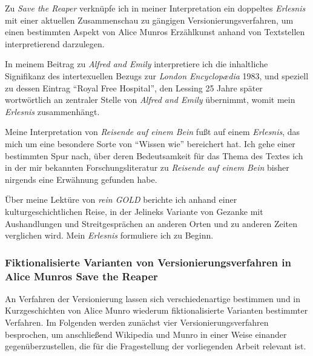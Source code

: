\documentclass[fontsize=12pt]{scrartcl}
\begin{document}
Zu \textit{Save the Reaper} verkn\"upfe ich in meiner Interpretation ein doppeltes \textit{Erlesnis} mit einer aktuellen Zusammenschau zu g\"angigen Versionierungsverfahren, um einen be\-stimmten Aspekt von Alice Munros Erz\"ahlkunst anhand von Textstellen interpretierend darzulegen.

In meinem Beitrag zu \textit{Alfred and Emily} interpretiere ich die inhaltliche Signifikanz des intertexuellen Bezugs zur \textit{London Encyclop{\ae}dia} 1983, und speziell zu dessen Eintrag "`Royal Free Hospital"', den Lessing 25 Jahre sp\"ater wortw\"ortlich an zentraler Stelle von \textit{Alfred and Emily} \"ubernimmt, womit mein \textit{Erlesnis} zusammenh\"angt.

Meine Interpretation von \textit{Reisende auf einem Bein} fu{\ss}t auf einem \textit{Erlesnis}, das mich um eine besondere Sorte von "`Wissen wie"' bereichert hat. Ich gehe einer bestimmten Spur nach, \"uber deren Bedeutsamkeit f\"ur das Thema des Textes ich in der mir bekannten For\-schungsli\-te\-ra\-tur zu \textit{Reisende auf einem Bein} bis\-her nirgends eine Erw\"ahnung gefunden habe.

\"Uber meine Lekt\"ure von \textit{rein GOLD} berichte ich anhand einer kulturgeschichtlichen Reise, in der Jelineks Variante von Gezanke mit Aushandlungen und Streit\-ge\-spr\"a\-chen an anderen Orten und zu anderen Zei\-ten verglichen wird. Mein \textit{Erlesnis} formuliere ich zu Beginn.


\newpage

\subsubsection{Fiktionalisierte Varianten von Versionierungsverfahren in Alice Munros \flq Save the Reaper\frq }
\label{subsubsec:5.4.1}

An Verfahren der Versionierung lassen sich verschiedenartige bestimmen und in Kurzgeschichten von Alice Munro wiederum fiktionalisierte Varianten bestimmter Verfahren. Im Folgenden werden zun\"achst \mbox{vier} Versionierungsverfahren besprochen, um anschlie{\ss}end Wi\-ki\-pe\-dia und Munro in einer Weise einander gegen\"uberzustellen, die f\"ur die Fragestellung der vorliegenden Arbeit relevant ist. 
\end{document}
